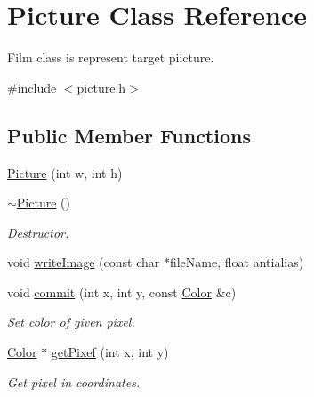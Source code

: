 \hypertarget{class_picture}{}\section{Picture Class Reference}
\label{class_picture}


Film class is represent target piicture.  




{\ttfamily \#include $<$picture.\+h$>$}

\subsection*{Public Member Functions}
\begin{DoxyCompactItemize}
\item 
\mbox{\hyperlink{class_picture_aa2edc676eb9b96172d226e0629687ee6}{Picture}} (int w, int h)
\item 
\mbox{\label{class_picture_a277f070f83063fa0922d2c1de8889a58}} 
\mbox{\hyperlink{class_picture_a277f070f83063fa0922d2c1de8889a58}{$\sim$\+Picture}} ()
\begin{DoxyCompactList}\small\item\em Destructor. \end{DoxyCompactList}\item 
void \mbox{\hyperlink{class_picture_ad79245b9b70902f0031e14f344e5a644}{write\+Image}} (const char $\ast$file\+Name, float antialias)
\item 
\mbox{\label{class_picture_a5cd236f2100c7425b70af120710ad845}} 
void \mbox{\hyperlink{class_picture_a5cd236f2100c7425b70af120710ad845}{commit}} (int x, int y, const \mbox{\hyperlink{class_color}{Color}} \&c)
\begin{DoxyCompactList}\small\item\em Set color of given pixel. \end{DoxyCompactList}\item 
\mbox{\label{class_picture_a6bb2ae998df39993d4b56ae106aaa3cb}} 
\mbox{\hyperlink{class_color}{Color}} $\ast$ \mbox{\hyperlink{class_picture_a6bb2ae998df39993d4b56ae106aaa3cb}{get\+Pixef}} (int x, int y)
\begin{DoxyCompactList}\small\item\em Get pixel in coordinates. \end{DoxyCompactList}\end{DoxyCompactItemize}


